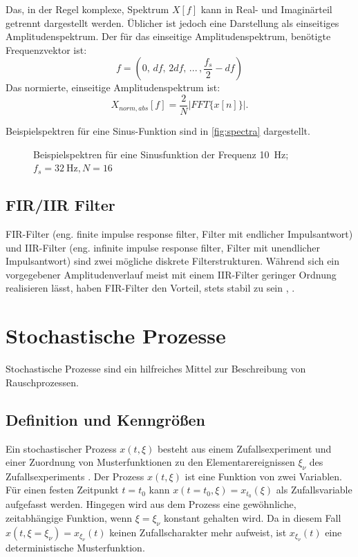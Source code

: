 Das, in der Regel komplexe, Spektrum $X[f]$ kann in Real- und Imaginärteil getrennt dargestellt werden. Üblicher ist jedoch eine Darstellung als einseitiges Amplitudenspektrum. Der für das einseitige Amplitudenspektrum, benötigte Frequenzvektor ist:
\begin{equation}
f=(0,\, df,\, 2df,\, ...\,, \frac{f_s}{2}-df)
\end{equation}
Das normierte, einseitige Amplitudenspektrum ist:
\begin{equation}
X_{norm,abs}[f]=\frac{2}{N} |FFT\{x[n]\}|.
\end{equation}

Beispielspektren für eine Sinus-Funktion sind in \autoref{fig:spectra} dargestellt.

\begin{figure}[H]
	\centering
	\hfill
	\hfill
	\caption[Spektrum Sinusfunktion]{Beispielspektren für eine Sinusfunktion der Frequenz \SI{10}{\hertz}; $f_s=\SI{32}{\hertz}, N=16$}
	\label{fig:spectra}
\end{figure}

\subsection{FIR/IIR Filter}
FIR-Filter (eng. finite impulse response filter, Filter mit endlicher Impulsantwort) und IIR-Filter (eng. infinite impulse response filter, Filter mit unendlicher Impulsantwort) sind zwei mögliche diskrete Filterstrukturen. Während sich ein vorgegebener Amplitudenverlauf meist mit einem IIR-Filter geringer Ordnung realisieren lässt, haben FIR-Filter den Vorteil, stets stabil zu sein \cite{Schmidt2014}, \cite{Thyagarajan2019}.

\section{Stochastische Prozesse}
Stochastische Prozesse sind ein hilfreiches Mittel zur Beschreibung von Rauschprozessen.

\subsection{Definition und Kenngrößen}
Ein stochastischer Prozess $x(t,\xi)$ besteht aus einem Zufallsexperiment und einer Zuordnung von Musterfunktionen zu den Elementarereignissen $\xi_\nu$ des Zufallsexperiments \cite[S.~243]{Leon2015}. Der Prozess $x(t,\xi)$ ist eine Funktion von zwei Variablen. Für einen festen Zeitpunkt $t=t_0$ kann $x(t=t_0,\xi)=x_{t_0}(\xi)$ als Zufallsvariable aufgefasst werden. Hingegen wird aus dem Prozess eine gewöhnliche, zeitabhängige Funktion, wenn $\xi=\xi_\nu$ konstant gehalten wird. Da in diesem Fall $x(t,\xi=\xi_\nu)=x_{\xi_\nu}(t)$ keinen Zufallscharakter mehr aufweist, ist $x_{\xi_\nu}(t)$ eine deterministische Musterfunktion.

